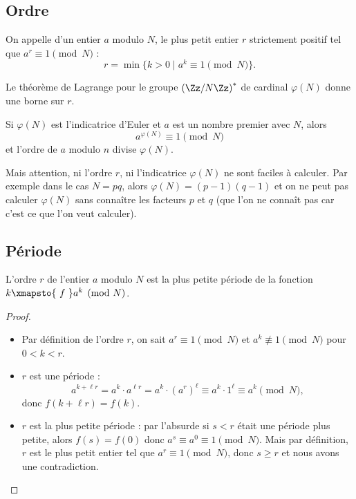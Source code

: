\documentclass[11pt,class=report,crop=false]{standalone}
\begin{document}
\subsection{Ordre}

\begin{definition}
On appelle  d'un entier $a$ modulo $N$, le plus petit entier $r$ strictement positif tel que $a^r \equiv 1 \pmod{N}$ :
$$r = \min \big\{ k>0 \mid a^k \equiv 1 \pmod{N} \big\}.$$ 
\end{definition}

Le théorème de Lagrange pour le groupe $\left(\Zz/N\Zz\right)^*$ de cardinal $\varphi(N)$ donne une borne sur $r$.
\begin{proposition}
Si $\varphi(N)$ est l'indicatrice d'Euler et $a$ est un nombre premier avec $N$, alors 
$$a^{\varphi(N)} \equiv 1 \pmod{N}$$ et l'ordre de $a$ modulo $n$ divise $\varphi(N)$.
\end{proposition}

Mais attention, ni l'ordre $r$, ni l'indicatrice $\varphi(N)$ ne sont faciles à calculer.
Par exemple dans le cas $N=pq$, alors $\varphi(N)=(p-1)(q-1)$ et on ne peut pas calculer $\varphi(N)$ sans connaître les facteurs $p$ et $q$ (que l'on ne connaît pas car c'est ce que l'on veut calculer).


\subsection{Période}

\begin{proposition}
L'ordre $r$ de l'entier $a$ modulo $N$ est la plus petite période de la fonction $k \xmapsto{\ f \ } a^k \pmod N$.
\end{proposition}


\begin{proof}~
\begin{itemize}
  \item Par définition de l'ordre $r$, on sait $a^r \equiv 1 \pmod N$ et $a^k \not\equiv 1 \pmod N$ pour $0<k<r$.
  \item $r$ est une période : 
  $$a^{k+\ell r} = a^k \cdot a^{\ell r} = a^k \cdot (a^r)^\ell \equiv a^k \cdot 1^\ell \equiv a^k \pmod N,$$
  donc $f(k+\ell r) = f(k)$. 
  \item $r$ est la plus petite période : par l'absurde si $s<r$ était une période plus petite, alors $f(s)=f(0)$ donc $a^s \equiv a^0 \equiv 1 \pmod N$.
  Mais par définition, $r$ est le plus petit entier tel que $a^r \equiv 1 \pmod N$, donc $s \ge r$ et nous avons une contradiction.
\end{itemize}
\end{proof}
\end{document}
